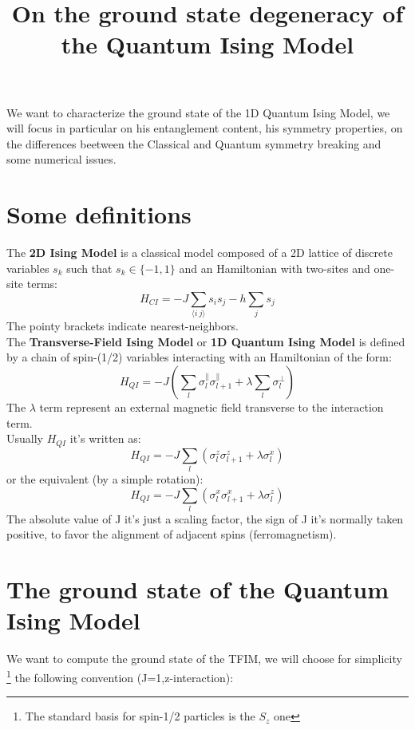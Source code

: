\documentclass[12pt,a4paper]{article}
\title{On the ground state degeneracy of the Quantum Ising Model}
\author{}
\begin{document}
	\maketitle

We want to characterize the ground state of the 1D Quantum Ising Model, we will focus in particular on his entanglement content, his symmetry properties, on the differences beetween the Classical and Quantum symmetry breaking and some numerical issues.

\section{Some definitions}
The \textbf{2D Ising Model} is a classical model composed of a 2D lattice of discrete variables $s_k$ such that  $s_k \in \{-1,1 \}$ and an Hamiltonian with two-sites and one-site terms:
\begin{equation}\label{eq:hamiltclass}
H_{CI}=-J\sum _{\langle i~j\rangle }s _{i}s _{j}-h\sum _{j}s _{j}
\end{equation}
The pointy brackets indicate nearest-neighbors. \\
The \textbf{Transverse-Field Ising Model} or \textbf{1D Quantum Ising Model} \cite{sachdev_2011} is defined by a chain of spin-(1/2) variables interacting with an Hamiltonian of the form:
\begin{equation}\label{eq:hamiltqi}
H_{QI}=-J(\sum _{ l }\sigma_{l}^\parallel\sigma_{l+1}^\parallel+\lambda\sum _{l}\sigma_{l}^\perp)
\end{equation}
The $\lambda$ term represent an external magnetic field transverse to the interaction term.\\
Usually $H_{QI}$ it's written as:
\begin{equation}\label{eq:hamilt}
	H_{QI}=-J \sum_{l}\left(\sigma_{l}^{z} \sigma_{l+1}^{z}+\lambda\sigma_{l}^{x}\right)	
\end{equation}
or the equivalent (by a simple rotation):
\begin{equation}
	H_{QI}=-J \sum_{l}\left(\sigma_{l}^{x} \sigma_{l+1}^{x}+\lambda\sigma_{l}^{z}\right)
\end{equation}
The absolute value of J it's just a scaling factor, the sign of J it's normally taken positive, to favor the alignment of adjacent spins (ferromagnetism).



\section{The ground state of the Quantum Ising Model}
We want to compute the ground state of the TFIM, we will choose for simplicity \footnote{The standard basis for spin-1/2 particles is the $S_z$ one} the following convention (J=1,z-interaction):
\end{document}
